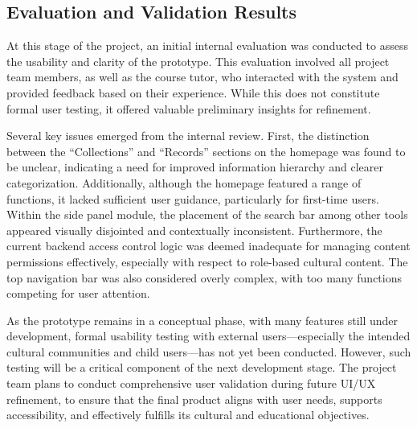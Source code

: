 ﻿%


\subsection{Evaluation and Validation Results}

At this stage of the project, an initial internal evaluation was conducted to assess the usability and clarity of the prototype. This evaluation involved all project team members, as well as the course tutor, who interacted with the system and provided feedback based on their experience. While this does not constitute formal user testing, it offered valuable preliminary insights for refinement.

Several key issues emerged from the internal review. First, the distinction between the “Collections” and “Records” sections on the homepage was found to be unclear, indicating a need for improved information hierarchy and clearer categorization. Additionally, although the homepage featured a range of functions, it lacked sufficient user guidance, particularly for first-time users. Within the side panel module, the placement of the search bar among other tools appeared visually disjointed and contextually inconsistent. Furthermore, the current backend access control logic was deemed inadequate for managing content permissions effectively, especially with respect to role-based cultural content. The top navigation bar was also considered overly complex, with too many functions competing for user attention.

As the prototype remains in a conceptual phase, with many features still under development, formal usability testing with external users—especially the intended cultural communities and child users—has not yet been conducted. However, such testing will be a critical component of the next development stage. The project team plans to conduct comprehensive user validation during future UI/UX refinement, to ensure that the final product aligns with user needs, supports accessibility, and effectively fulfills its cultural and educational objectives.